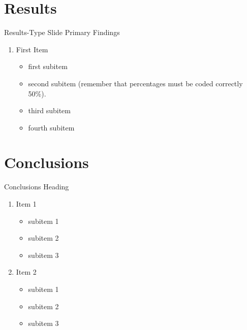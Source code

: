 \documentclass[newPxFont]{beamer}
\begin{document}
\section{Results}


\begin{frame}[c]{Results-Type Slide}
	Primary Findings	
	\begin{enumerate}   
		\item{First Item}
		\begin{itemize}
			\item{first subitem}
			\item{second subitem (remember that percentages must be coded correctly 50\%).}
			\item{third subitem}
			\item{fourth subitem}
		\end{itemize}
	\end{enumerate}	
\end{frame}

%
%
\section{Conclusions}


\begin{frame}[c]{Conclusions}
	Heading
	\begin{enumerate}   
		\item{Item 1}  
		\begin{itemize}
			\item{subitem 1}
			\item{subitem 2}
			\item{subitem 3}
		\end{itemize}
		\item{Item 2}
		\begin{itemize}
			\item{subitem 1}
			\item{subitem 2}
			\item{subitem 3}
		\end{itemize}
	\end{enumerate}	
\end{frame}
\end{document}
